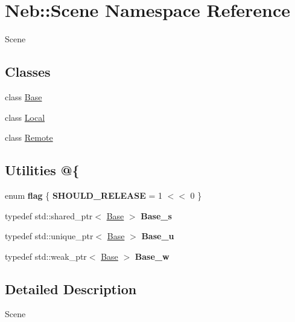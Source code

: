 \hypertarget{namespaceNeb_1_1Scene}{\section{\-Neb\-:\-:\-Scene \-Namespace \-Reference}
\label{namespaceNeb_1_1Scene}
}


\-Scene  


\subsection*{\-Classes}
\begin{DoxyCompactItemize}
\item 
class \hyperlink{classNeb_1_1Scene_1_1Base}{\-Base}
\item 
class \hyperlink{classNeb_1_1Scene_1_1Local}{\-Local}
\item 
class \hyperlink{classNeb_1_1Scene_1_1Remote}{\-Remote}
\end{DoxyCompactItemize}
\subsection*{\-Utilities @\{}
\begin{DoxyCompactItemize}
\item 
enum {\bfseries flag} \{ {\bfseries \-S\-H\-O\-U\-L\-D\-\_\-\-R\-E\-L\-E\-A\-S\-E} =  1 $<$$<$ 0
 \}
\item 
\hypertarget{namespaceNeb_1_1Scene_aebcf94cf65fb1252f20b8eb7c0d145bf}{typedef std\-::shared\-\_\-ptr$<$ \hyperlink{classNeb_1_1Scene_1_1Base}{\-Base} $>$ {\bfseries \-Base\-\_\-s}}\label{namespaceNeb_1_1Scene_aebcf94cf65fb1252f20b8eb7c0d145bf}

\item 
\hypertarget{namespaceNeb_1_1Scene_a09fb947e0af96de8b83d0f872b128c40}{typedef std\-::unique\-\_\-ptr$<$ \hyperlink{classNeb_1_1Scene_1_1Base}{\-Base} $>$ {\bfseries \-Base\-\_\-u}}\label{namespaceNeb_1_1Scene_a09fb947e0af96de8b83d0f872b128c40}

\item 
\hypertarget{namespaceNeb_1_1Scene_a13c1594227693bd4c0ca2fcf841a5f8d}{typedef std\-::weak\-\_\-ptr$<$ \hyperlink{classNeb_1_1Scene_1_1Base}{\-Base} $>$ {\bfseries \-Base\-\_\-w}}\label{namespaceNeb_1_1Scene_a13c1594227693bd4c0ca2fcf841a5f8d}

\end{DoxyCompactItemize}


\subsection{\-Detailed \-Description}
\-Scene 